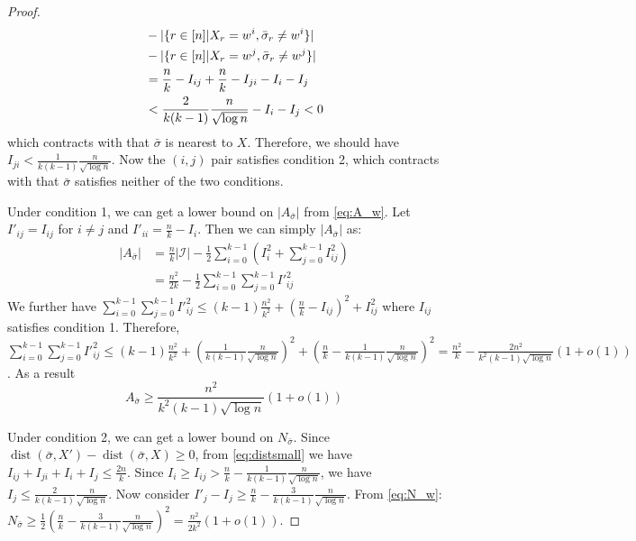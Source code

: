 \documentclass[entropy,article,submit,moreauthors,pdftex]{Definitions/mdpi}
\newcommand{\cI}{\mathcal{I}}
\newcommand{\1}{\mathbbm{1}}
\DeclareMathOperator{\Dist}{dist}
\begin{document}
\begin{proof}
\begin{align}
	&-|\{ r \in [n]|X_r=w^i, \bar{\sigma}_r \neq w^i \}| \notag\\
	&- |\{ r \in [n]|X_r=w^j, \bar{\sigma}_r \neq w^j \}| \notag\\
	& = \frac{n}{k} - I_{ij} +  \frac{n}{k} - I_{ji} - I_i - I_j\label{eq:distsmall} \\
	& < \frac{2}{k(k-1)}\frac{n}{\sqrt{\log n}} - I_i - I_j < 0\notag
	\end{align}
	which contracts with that $\bar{\sigma}$ is nearest to $X$.
	Therefore, we should have $I_{ji} < \frac{1}{k(k-1)}\frac{n}{\sqrt{\log n}}$.
	Now the $(i, j)$ pair satisfies condition 2, which contracts with that $\bar{\sigma}$ satisfies neither of the two conditions.
	
	Under condition 1, we can get a lower bound on $|A_{\bar{\sigma}}|$ from \eqref{eq:A_w}. Let $I'_{ij} = I_{ij}$ for $i\neq j$ and
	$I'_{ii} = \frac{n}{k} - I_i$. Then we can simply $|A_{\bar{\sigma}}|$ as:
	\begin{align*}
	|A_{\bar{\sigma}}| &= \frac{n}{k}|\cI| - \frac{1}{2}\sum_{i=0}^{k-1}  (I^2_i + \sum_{j=0}^{k-1} I^2_{ij}) \\
	&= \frac{n^2}{2k} - \frac{1}{2} \sum_{i=0}^{k-1} \sum_{j=0}^{k-1} I'^2_{ij}
	\end{align*}
	We further have $\sum_{i=0}^{k-1} \sum_{j=0}^{k-1} I'^2_{ij} \leq (k-1)\frac{n^2}{k^2} + (\frac{n}{k} - I_{ij})^2 + I^2_{ij}$ where
	$I_{ij}$ satisfies condition 1. Therefore, $\sum_{i=0}^{k-1} \sum_{j=0}^{k-1} I'^2_{ij} \leq (k-1)\frac{n^2}{k^2} + (\frac{1}{k(k-1)}\frac{n}{\sqrt{\log n}})^2
	+ (\frac{n}{k} - \frac{1}{k(k-1)}\frac{n}{\sqrt{\log n}})^2 = \frac{n^2}{k} - \frac{2n^2}{k^2 (k-1)\sqrt{\log n}}(1+o(1))$.
	As a result
	\begin{equation}\label{eq:Asigma}
	A_{\bar{\sigma}} \geq \frac{n^2}{k^2 (k-1)\sqrt{\log n}}(1+o(1))
	\end{equation}
	
	
	Under condition 2, we can get a lower bound on $N_{\bar{\sigma}}$. Since
	$\Dist(\bar{\sigma}, X') - \Dist(\bar{\sigma}, X) \geq 0$, from \eqref{eq:distsmall} we have
	$I_{ij} + I_{ji} + I_{i} + I_j \leq \frac{2n}{k} $.
	Since $I_i \geq I_{ij} > \frac{n}{k} - \frac{1}{k(k-1)}\frac{n}{\sqrt{\log n}}$,
	we have $I_j \leq \frac{2}{k(k-1)}\frac{n}{\sqrt{\log n} }$.
	Now consider $I'_j - I_j \geq  \frac{n}{k} - \frac{3}{k(k-1)}\frac{n}{\sqrt{\log n} }$.
	From \eqref{eq:N_w}: $N_{\bar{\sigma}} \geq \frac{1}{2}(\frac{n}{k} - \frac{3}{k(k-1)}\frac{n}{\sqrt{\log n}})^2 = \frac{n^2}{2k^2}(1+o(1))$.
	

\end{proof}
\end{document}
